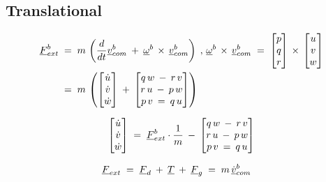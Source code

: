 \subsection{Translational}
\begin{align*}
	\colvec{F}^b_{ext}\;&=\;m\,\left(\frac{d}{dt}\colvec{v}^b_{com}\:+\:\colvec{\omega}^b\,\times\,\colvec{v}^b_{com}\right)\;,\,
	\colvec{\omega}^b\,\times\,\colvec{v}^b_{com}\;=\;\begin{bmatrix*}p\\q\\r\end{bmatrix*}\,\times\,\begin{bmatrix*}u\\v\\w\end{bmatrix*}\\
	&=\;m\,\left(\begin{bmatrix*}\dot{u}\\\dot{v}\\\dot{w}\end{bmatrix*}\:+\:\begin{bmatrix*}q\,w\:-\:r\,v\\r\,u\:-\:p\,w\\p\,v\:=\:q\,u\end{bmatrix*}\right)\\
\end{align*}

\begin{align*}
	\begin{bmatrix}\dot{u}\\\dot{v}\\\dot{w}\end{bmatrix}\;=\;\colvec{F}^b_{ext}\cdot\frac{1}{m}\:-\:\begin{bmatrix*}q\,w\:-\:r\,v\\r\,u\:-\:p\,w\\p\,v\:=\:q\,u\end{bmatrix*}
\end{align*}

\begin{align}
	\underline{F}_{ext}\;&=\;\underline{F}_{d}\:+\:\underline{T}\:+\:\underline{F}_{g}\;=\;m\,\underline{\dot{v}}^b_{com}
\end{align}

